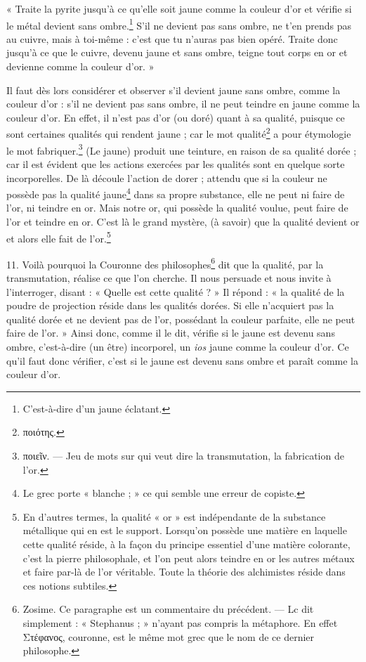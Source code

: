 \documentclass[landscape, a4paper, 11pt, oneside, polutonikogreek, french]{article}
\begin{document}
« Traite la pyrite jusqu'à ce qu'elle soit jaune comme la couleur d'or et vérifie si le métal devient sans ombre.\footnote{C'est-à-dire d'un jaune éclatant.} S'il ne devient pas sans ombre, ne t'en prends pas au cuivre, mais à toi-même : c'est que tu n'auras pas bien opéré. Traite donc jusqu'à ce que le cuivre, devenu jaune et sans ombre, teigne tout corps en or et devienne comme la couleur d'or. »

Il faut dès lors considérer et observer s'il devient jaune sans ombre, comme la couleur d'or : s'il ne devient pas sans ombre, il ne peut teindre en jaune comme la couleur d'or. En effet, il n'est pas d'or (ou doré) quant à sa qualité, puisque ce sont certaines qualités qui rendent jaune ; car le mot qualité\footnote{ποιότης.} a pour étymologie le mot fabriquer.\footnote{ποιεῖν. --- Jeu de mots sur qui veut dire la transmutation, la fabrication de l'or.} (Le jaune) produit une teinture, en raison de sa qualité dorée ; car il est évident que les actions exercées par les qualités sont en quelque sorte incorporelles. De là découle l'action de dorer ; attendu que si la couleur ne possède pas la qualité jaune\footnote{Le grec porte « blanche ; » ce qui semble une erreur de copiste.} dans sa propre substance, elle ne peut ni faire de l'or, ni teindre en or. Mais notre or, qui possède la qualité voulue, peut faire de l'or et teindre en or. C'est là le grand mystère, (à savoir) que la qualité devient or et alors elle fait de l'or.\footnote{En d'autres termes, la qualité « or » est indépendante de la substance métallique qui en est le support. Lorsqu'on possède une matière en laquelle cette qualité réside, à la façon du principe essentiel d'une matière colorante, c'est la pierre philosophale, et l'on peut alors teindre en or les autres métaux et faire par-là de l'or véritable. Toute la théorie des alchimistes réside dans ces notions subtiles.}

11. Voilà pourquoi la Couronne des philosophes\footnote{Zosime. Ce paragraphe est un commentaire du précédent. --- Lc dit simplement : « Stephanus ; » n'ayant pas compris la métaphore. En effet Στέφανος, couronne, est le même mot grec que le nom de ce dernier philosophe.} dit que la qualité, par la transmutation, réalise ce que l'on cherche. Il nous persuade et nous invite à l'interroger, disant : « Quelle est cette qualité ? » Il répond : « la qualité de la poudre de projection réside dans les qualités dorées. Si elle n'acquiert pas la qualité dorée et ne devient pas de l'or, possédant la couleur parfaite, elle ne peut faire de l'or. » Ainsi donc, comme il le dit, vérifie si le jaune est devenu sans ombre, c'est-à-dire (un être) incorporel, un \emph{ios} jaune comme la couleur d'or. Ce qu'il faut donc vérifier, c'est si le jaune est devenu sans ombre et paraît comme la couleur d'or.
\end{document}
